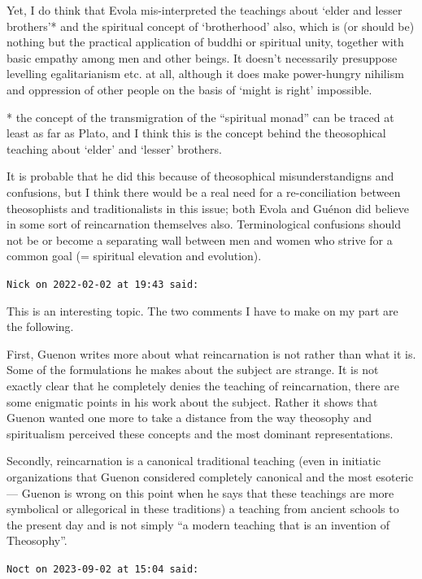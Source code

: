 \begin{footnotesize}
\begin{sffamily}
Yet, I do think that Evola mis-interpreted the teachings about `elder and lesser brothers'* and the spiritual concept of `brotherhood' also, which is (or should be) nothing but the practical application of buddhi or spiritual unity, together with basic empathy among men and other beings. It doesn't necessarily presuppose levelling egalitarianism etc. at all, although it does make power-hungry nihilism and oppression of other people on the basis of `might is right' impossible.

* the concept of the transmigration of the ``spiritual monad'' can be traced at least as far as Plato, and I think this is the concept behind the theosophical teaching about `elder' and `lesser' brothers.

It is probable that he did this because of theosophical misunderstandigns and confusions, but I think there would be a real need for a re-conciliation between theosophists and traditionalists in this issue; both Evola and Guénon did believe in some sort of reincarnation themselves also. Terminological confusions should not be or become a separating wall between men and women who strive for a common goal (= spiritual elevation and evolution).

\hfill

\texttt{Nick on 2022-02-02 at 19:43 said:}

This is an interesting topic. The two comments I have to make on my part are the following.

First, Guenon writes more about what reincarnation is not rather than what it is. Some of the formulations he makes about the subject are strange. It is not exactly clear that he completely denies the teaching of reincarnation, there are some enigmatic points in his work about the subject. Rather it shows that Guenon wanted one more to take a distance from the way theosophy and spiritualism perceived these concepts and the most dominant representations.

Secondly, reincarnation is a canonical traditional teaching (even in initiatic organizations that Guenon considered completely canonical and the most esoteric --- Guenon is wrong on this point when he says that these teachings are more symbolical or allegorical in these traditions) a teaching from ancient schools to the present day and is not simply ``a modern teaching that is an invention of Theosophy''.

\hfill

\texttt{Noct on 2023-09-02 at 15:04 said:}


\end{sffamily}
\end{footnotesize}
